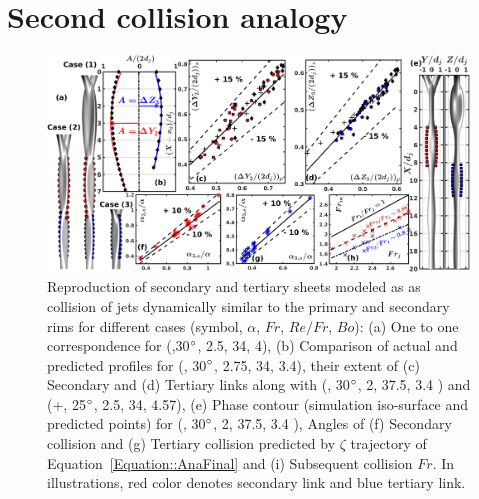 \documentclass{jfm}
\begin{document}
\section{Second collision analogy}
\begin{figure}
	\centering
	\includegraphics[width=\linewidth]{Figure8}
	\caption{Reproduction of secondary and tertiary sheets modeled as as collision of jets dynamically similar to the primary and secondary rims for different cases (symbol, $\alpha$, $Fr$, $Re/Fr$, $Bo$): (a) One to one correspondence for (\protect\MarkerCircleEmpty,30$\degree$, 2.5, 34, 4), (b) Comparison of actual and predicted profiles for (\protect\MarkerDiamondBlack, 30$\degree$, 2.75, 34, 3.4), their extent of (c) Secondary and (d) Tertiary links along with (\protect\MarkerSquareEmpty, 30$\degree$, 2, 37.5, 3.4 ) and (+, 25$\degree$, 2.5, 34, 4.57), (e) Phase contour (simulation iso-surface and predicted points) for (\protect\MarkerSquareEmpty, 30$\degree$, 2, 37.5, 3.4 ), Angles of (f) Secondary collision and (g) Tertiary collision predicted by $\zeta$ trajectory of Equation~\ref{Equation::AnaFinal} and (i) Subsequent collision $Fr$. In illustrations, red color denotes secondary link and blue tertiary link.}
	\label{Figure::secondCollision}
\end{figure}
\end{document}
